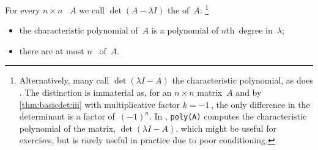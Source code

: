 \begin{theorem} \label{thm:geecp}
For every \(n\times n\) ~\(A\) we call \(\det(A-\lambda I)\) the  of~\(A\):
\footnote{Alternatively, many call \(\det(\lambda I-A)\) the characteristic polynomial, as does \script.  
The distinction is immaterial as,  for an \(n\times n\) matrix~\(A\) and by \autoref{thm:basicdet:iii} with multiplicative factor \(k=-1\)\,, the only difference in the determinant is a factor of~\((-1)^n\).
In \script, \texttt{poly(A)} computes the characteristic polynomial of the matrix,  \(\det(\lambda I-A)\), which might be useful for exercises, but is rarely useful in practice due to poor conditioning.}
\begin{itemize}
\item the characteristic polynomial of~\(A\) is a polynomial of \(n\)th~degree in~\(\lambda\);
\item  there are at most \(n\)~ of~\(A\).
\end{itemize}
\end{theorem}

